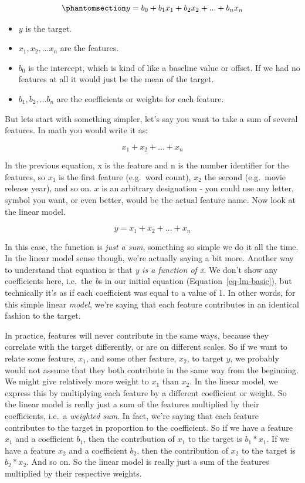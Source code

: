 \documentclass[
  letterpaper,
]{krantz}
\providecommand{\tightlist}{%
  \setlength{\itemsep}{0pt}\setlength{\parskip}{0pt}}\usepackage{longtable,booktabs,array}
\begin{document}
\begin{equation}\phantomsection\label{eq-lm-basic}{
y = b_0 + b_1x_1 + b_2x_2 + ... + b_nx_n
}\end{equation}

\begin{itemize}
\tightlist
\item
  \(y\) is the target.
\item
  \(x_1, x_2, ... x_n\) are the features.
\item
  \(b_0\) is the intercept, which is kind of like a baseline value or
  offset. If we had no features at all it would just be the mean of the
  target.
\item
  \(b_1, b_2, ... b_n\) are the coefficients or weights for each
  feature.
\end{itemize}

But lets start with something simpler, let's say you want to take a sum
of several features. In math you would write it as:

\[
x_1 + x_2 + ... + x_n
\]

In the previous equation, x is the feature and n is the number
identifier for the features, so \(x_1\) is the first feature (e.g.~word
count), \(x_2\) the second (e.g.~movie release year), and so on. \(x\)
is an arbitrary designation - you could use any letter, symbol you want,
or even better, would be the actual feature name. Now look at the linear
model.

\[
y = x_1 + x_2 + ... + x_n
\]

In this case, the function is \emph{just a sum}, something so simple we
do it all the time. In the linear model sense though, we're actually
saying a bit more. Another way to understand that equation is that
\emph{y is a function of x}. We don't show any coefficients here,
i.e.~the \emph{b}s in our initial equation (Equation~\ref{eq-lm-basic}),
but technically it's as if each coefficient was equal to a value of 1.
In other words, for this simple linear \emph{model}, we're saying that
each feature contributes in an identical fashion to the target.

In practice, features will never contribute in the same ways, because
they correlate with the target differently, or are on different scales.
So if we want to relate some feature, \(x_1\), and some other feature,
\(x_2\), to target \(y\), we probably would not assume that they both
contribute in the same way from the beginning. We might give relatively
more weight to \(x_1\) than \(x_2\). In the linear model, we express
this by multiplying each feature by a different coefficient or weight.
So the linear model is really just a sum of the features multiplied by
their coefficients, i.e.~a \emph{weighted sum}. In fact, we're saying
that each feature contributes to the target in proportion to the
coefficient. So if we have a feature \(x_1\) and a coefficient \(b_1\),
then the contribution of \(x_1\) to the target is \(b_1*x_1\). If we
have a feature \(x_2\) and a coefficient \(b_2\), then the contribution
of \(x_2\) to the target is \(b_2 * x_2\). And so on. So the linear
model is really just a sum of the features multiplied by their
respective weights.
\end{document}
